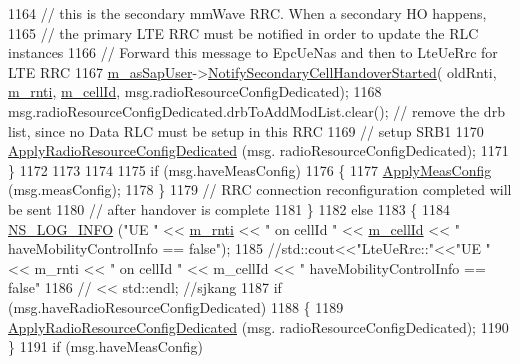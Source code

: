 \begin{DoxyCode}
1164             \textcolor{comment}{// this is the secondary mmWave RRC. When a secondary HO happens,}
1165             \textcolor{comment}{// the primary LTE RRC must be notified in order to update the RLC instances}
1166             \textcolor{comment}{// Forward this message to EpcUeNas and then to LteUeRrc for LTE RRC}
1167             \hyperlink{classns3_1_1LteUeRrc_aef8b3b6b1b1527ce6946472d1c1888dc}{m\_asSapUser}->\hyperlink{classns3_1_1LteAsSapUser_a9690b194850b741627240f3ca5f4a770}{NotifySecondaryCellHandoverStarted}(
      oldRnti, \hyperlink{classns3_1_1LteUeRrc_a8e078d8ef0ad23e670fe2ef08caab84f}{m\_rnti}, \hyperlink{classns3_1_1LteUeRrc_aa9d3317734eea9158371d9fccf3a0c48}{m\_cellId}, msg.radioResourceConfigDedicated);
1168             msg.radioResourceConfigDedicated.drbToAddModList.clear(); \textcolor{comment}{// remove the drb list, since no Data
       RLC must be setup in this RRC}
1169             \textcolor{comment}{// setup SRB1}
1170             \hyperlink{classns3_1_1LteUeRrc_af7c2bc93366a56a35793c3ef6bce5ce3}{ApplyRadioResourceConfigDedicated} (msg.
      radioResourceConfigDedicated);
1171           \}
1172 
1173 
1174 
1175           \textcolor{keywordflow}{if} (msg.haveMeasConfig)
1176             \{
1177               \hyperlink{classns3_1_1LteUeRrc_a2cd87b415e4e40dfbaa9d08c406bd9bd}{ApplyMeasConfig} (msg.measConfig);
1178             \}
1179           \textcolor{comment}{// RRC connection reconfiguration completed will be sent}
1180           \textcolor{comment}{// after handover is complete}
1181         \}
1182       \textcolor{keywordflow}{else}
1183         \{
1184           \hyperlink{group__logging_gafbd73ee2cf9f26b319f49086d8e860fb}{NS\_LOG\_INFO} (\textcolor{stringliteral}{"UE "} << \hyperlink{classns3_1_1LteUeRrc_a8e078d8ef0ad23e670fe2ef08caab84f}{m\_rnti} << \textcolor{stringliteral}{" on cellId "} << 
      \hyperlink{classns3_1_1LteUeRrc_aa9d3317734eea9158371d9fccf3a0c48}{m\_cellId} << \textcolor{stringliteral}{" haveMobilityControlInfo == false"});
1185          \textcolor{comment}{//std::cout<<"LteUeRrc::"<<"UE " << m\_rnti << " on cellId " << m\_cellId << "
       haveMobilityControlInfo == false"}
1186         \textcolor{comment}{//               << std::endl; //sjkang}
1187           \textcolor{keywordflow}{if} (msg.haveRadioResourceConfigDedicated) 
1188             \{
1189               \hyperlink{classns3_1_1LteUeRrc_af7c2bc93366a56a35793c3ef6bce5ce3}{ApplyRadioResourceConfigDedicated} (msg.
      radioResourceConfigDedicated);
1190             \} 
1191           \textcolor{keywordflow}{if} (msg.haveMeasConfig)

\end{DoxyCode}
